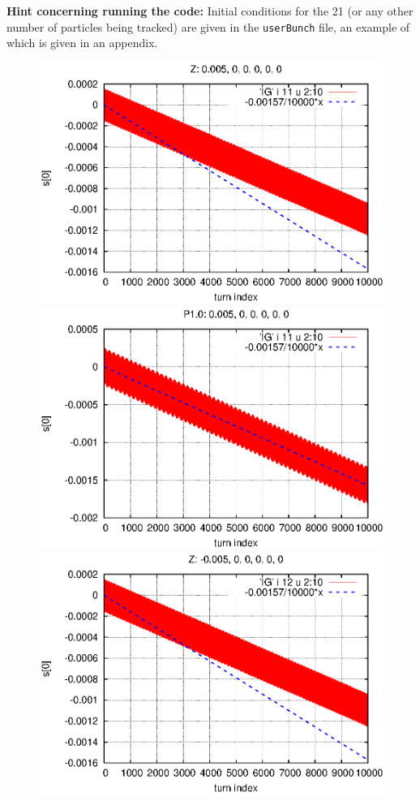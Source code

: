 \documentclass[]{article}
\begin{document}
\bigskip

\noindent
{\bf Hint concerning running the code:} Initial conditions for the 21 (or any
other number of particles being tracked) are given in the {\tt userBunch} file,
an example of which is given in an appendix. 
\bigskip
%
\begin{figure}[h]
\centering
\includegraphics[scale=0.6]{eps/SpinEvolve11.Z.eps}
\includegraphics[scale=0.6]{eps/SpinEvolve11.P1.0.eps}
\includegraphics[scale=0.6]{eps/SpinEvolve12.Z.eps}

\end{figure}
\end{document}
